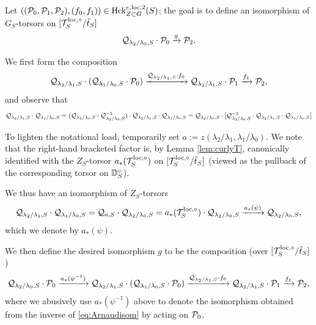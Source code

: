 Let $((\mathcal{P}_{0},\mathcal{P}_{1},\mathcal{P}_{2}), (f_{0},f_{1})) \in \textnormal{Hck}_{Z \subset G}^{e,\mathrm{loc},2}(S)$; the goal is to define an isomorphism of $G_{S}$-torsors on $[\mathcal{T}_{S}^{\mathrm{loc},\circ}/\tilde{t}_{S}]$
\begin{equation*}
\mathcal{Q}_{\lambda_{2}/\lambda_{0},S} \cdot \mathcal{P}_{0} \xrightarrow{g} \mathcal{P}_{2}.
\end{equation*}

We first form the composition
 \begin{equation*}
 \mathcal{Q}_{\lambda_{2}/\lambda_{1},S}\cdot(\mathcal{Q}_{\lambda_{1}/\lambda_{0},S}  \cdot \mathcal{P}_{0}) \xrightarrow{\mathcal{Q}_{\lambda_{2}/\lambda_{1},S} \cdot f_{0}} \mathcal{Q}_{\lambda_{2}/\lambda_{1},S} \cdot \mathcal{P}_{1} \xrightarrow{f_{1}} \mathcal{P}_{2},
 \end{equation*}
 and observe that 
 \begin{equation*}
 \mathcal{Q}_{\lambda_{2}/\lambda_{1},S}\cdot \mathcal{Q}_{\lambda_{1}/\lambda_{0},S} = (\mathcal{Q}_{\lambda_{2}/\lambda_{0},S} \cdot \mathcal{Q}_{\lambda_{2}/\lambda_{0},S}^{-1}) \cdot  \mathcal{Q}_{\lambda_{2}/\lambda_{1},S}\cdot \mathcal{Q}_{\lambda_{1}/\lambda_{0},S} = \mathcal{Q}_{\lambda_{2}/\lambda_{0},S} \cdot [\mathcal{Q}_{\lambda_{2}/\lambda_{0},S}^{-1} \cdot  \mathcal{Q}_{\lambda_{2}/\lambda_{1},S}\cdot \mathcal{Q}_{\lambda_{1}/\lambda_{0},S}]
 \end{equation*}

  To lighten the notational load, temporarily set $a:=z(\lambda_{2}/\lambda_{1},\lambda_{1}/\lambda_{0})$. We note that the right-hand bracketed factor is, by Lemma \ref{lem:curlyT}, canonically identified with the $Z_{S}$-torsor $a_{*}(\mathcal{T}_{S}^{\mathrm{loc},\circ})$ on $[\mathcal{T}_{S}^{\mathrm{loc},\circ}/\tilde{t}_{S}]$ (viewed as the pullback of the corresponding torsor on $\mathbb D_{S}^{\circ}$). 
 
    We thus have an isomorphism of $Z_{S}$-torsors
\begin{equation}\label{eq:Arnaudisom}
    \mathcal{Q}_{\lambda_{2}/\lambda_{1},S} \cdot \mathcal{Q}_{\lambda_{1}/\lambda_{0},S} = \mathcal{Q}_{a,S} \cdot \mathcal{Q}_{\lambda_{2}/\lambda_{0},S} = a_{*}(\mathcal{T}_{S}^{\mathrm{loc},\circ}) \cdot \mathcal{Q}_{\lambda_{2}/\lambda_{0},S} \xrightarrow{a_{*}(\psi)} \mathcal{Q}_{\lambda_{2}/\lambda_{0},S},
\end{equation}
which we denote by $a_{*}(\psi)$.

We then define the desired isomorphism $g$ to be the composition (over $[\mathcal{T}_{S}^{\mathrm{loc},\circ}/\tilde{t}_{S}]$)
 \begin{equation}\label{eq:gconv}
 \mathcal{Q}_{\lambda_{2}/\lambda_{0},S}  \cdot \mathcal{P}_{0} \xrightarrow{a_{*}(\psi^{-1})}   \mathcal{Q}_{\lambda_{2}/\lambda_{1},S} \cdot (\mathcal{Q}_{\lambda_{1}/\lambda_{0},S} \cdot \mathcal{P}_{0}) \xrightarrow{\mathcal{Q}_{\lambda_{2}/\lambda_{1},S} \cdot f_{0}} \mathcal{Q}_{\lambda_{2}/\lambda_{1},S} \cdot \mathcal{P}_{1} \xrightarrow{f_{1}} \mathcal{P}_{2},
\end{equation}
where we abusively use $a_{*}(\psi^{-1})$ above to denote the isomorphism obtained from the inverse of \eqref{eq:Arnaudisom} by acting on $\mathcal{P}_{0}$.

